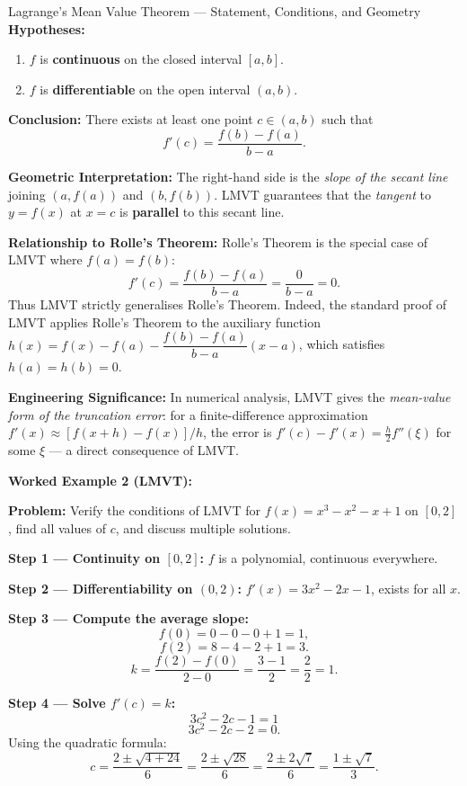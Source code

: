 \documentclass[12pt,a4paper]{article}
\begin{document}
\begin{infobox}{Lagrange's Mean Value Theorem --- Statement, Conditions, and Geometry}
\textbf{Hypotheses:}
\begin{enumerate}
  \item $f$ is \textbf{continuous} on the closed interval $[a, b]$.
  \item $f$ is \textbf{differentiable} on the open interval $(a, b)$.
\end{enumerate}

\textbf{Conclusion:} There exists at least one point $c \in (a, b)$ such that
\[
  \boxed{f'(c) = \frac{f(b) - f(a)}{b - a}.}
\]

\textbf{Geometric Interpretation:}
The right-hand side is the \emph{slope of the secant line} joining $(a, f(a))$ and $(b, f(b))$.
LMVT guarantees that the \emph{tangent} to $y = f(x)$ at $x = c$ is \textbf{parallel} to
this secant line.

\textbf{Relationship to Rolle's Theorem:}
Rolle's Theorem is the special case of LMVT where $f(a) = f(b)$:
\[
  f'(c) = \frac{f(b) - f(a)}{b - a} = \frac{0}{b-a} = 0.
\]
Thus LMVT strictly generalises Rolle's Theorem. Indeed, the standard proof of LMVT
applies Rolle's Theorem to the auxiliary function
$h(x) = f(x) - f(a) - \dfrac{f(b)-f(a)}{b-a}(x-a)$,
which satisfies $h(a)=h(b)=0$.

\textbf{Engineering Significance:}
In numerical analysis, LMVT gives the \emph{mean-value form of the truncation error}:
for a finite-difference approximation $f'(x) \approx [f(x+h)-f(x)]/h$, the error is
$f'(c) - f'(x) = \frac{h}{2}f''(\xi)$ for some $\xi$ --- a direct consequence of LMVT.
\end{infobox}

\textbf{Worked Example 2 (LMVT):}

\medskip
\noindent\textbf{Problem:} Verify the conditions of LMVT for
$f(x) = x^3 - x^2 - x + 1$ on $[0, 2]$,
find all values of $c$, and discuss multiple solutions.

\medskip
\textbf{Step 1 --- Continuity on $[0,2]$:}
$f$ is a polynomial, continuous everywhere. \checkmark

\textbf{Step 2 --- Differentiability on $(0,2)$:}
$f'(x) = 3x^2 - 2x - 1$, exists for all $x$. \checkmark

\textbf{Step 3 --- Compute the average slope:}
\[
  f(0) = 0 - 0 - 0 + 1 = 1,
\]
\[
  f(2) = 8 - 4 - 2 + 1 = 3.
\]
\[
  k = \frac{f(2) - f(0)}{2 - 0} = \frac{3 - 1}{2} = \frac{2}{2} = 1.
\]

\textbf{Step 4 --- Solve $f'(c) = k$:}
\[
  3c^2 - 2c - 1 = 1
\]
\[
  3c^2 - 2c - 2 = 0.
\]
Using the quadratic formula:
\[
  c = \frac{2 \pm \sqrt{4 + 24}}{6} = \frac{2 \pm \sqrt{28}}{6} = \frac{2 \pm 2\sqrt{7}}{6} = \frac{1 \pm \sqrt{7}}{3}.
\]
\end{document}
